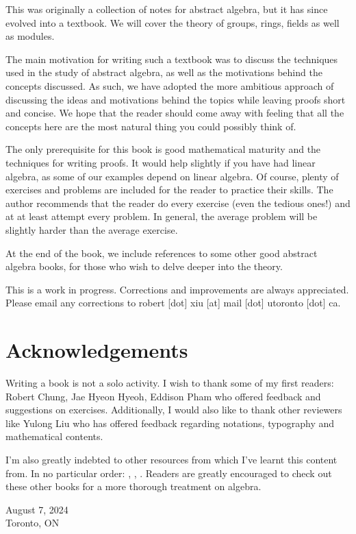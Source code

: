 \documentclass[./main.tex]{subfiles}
\begin{document}
This was originally a collection of notes for abstract algebra, but it has since
evolved into a textbook. We will cover the theory of groups, rings, fields as
well as modules. 

The main motivation for writing such a textbook was to discuss the techniques
used in the study of abstract algebra, as well as the motivations behind the
concepts discussed. As such, we have adopted the more ambitious approach of
discussing the ideas and motivations behind the topics while leaving proofs
short and concise. We hope that the reader should come away with feeling that
all the concepts here are the most natural thing you could possibly think of.

The only prerequisite for this book is good mathematical maturity and the
techniques for writing proofs. It would help slightly if you have had
linear algebra, as some of our examples depend on linear algebra. Of course,
plenty of exercises and problems are included for the reader to practice
their skills. The author recommends that the reader do every exercise (even
the tedious ones!) and at at least attempt every problem. In general, the
average problem will be slightly harder than the average exercise.

At the end of the book, we include references to some other good abstract
algebra books, for those who wish to delve deeper into the theory.

This is a work in progress. Corrections and improvements are always
appreciated. Please email any corrections to robert [dot] xiu [at] mail
[dot] utoronto [dot] ca. 

\section*{Acknowledgements}
Writing a book is not a solo activity. I wish to thank some of my first readers:
Robert Chung, Jae Hyeon Hyeoh, Eddison Pham who offered feedback and suggestions
on exercises. Additionally, I would also like to thank other reviewers like
Yulong Liu who has offered feedback regarding notations, typography and
mathematical contents.

I'm also greatly indebted to other resources from which I've learnt this content
from. In no particular order: \cite{Gallian_2020}, \cite{Dummit_Foote_2004},
\cite{Jacobson_2009}. Readers are greatly encouraged to check out these other
books for a more thorough treatment on algebra.

August 7, 2024\\
Toronto, ON
\end{document}
